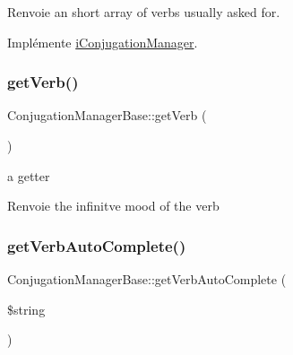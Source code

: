 \begin{DoxyReturn}{Renvoie}
an short array of verbs usually asked for. 
\end{DoxyReturn}


Implémente \hyperlink{interfacei_conjugation_manager_a2a7ed39313c1c92ef5c01c88895de36e}{i\+Conjugation\+Manager}.

\hypertarget{class_conjugation_manager_base_ae6e9d7d21418b8b9831b2b1f29eca4a6}{}\label{class_conjugation_manager_base_ae6e9d7d21418b8b9831b2b1f29eca4a6} 
\subsubsection{\texorpdfstring{get\+Verb()}{getVerb()}}
{\footnotesize\ttfamily Conjugation\+Manager\+Base\+::get\+Verb (\begin{DoxyParamCaption}{ }\end{DoxyParamCaption})}



a getter 

\begin{DoxyReturn}{Renvoie}
the infinitve mood of the verb 
\end{DoxyReturn}
\hypertarget{class_conjugation_manager_base_ac645c98d094ad5be6eec9950d04ee937}{}\label{class_conjugation_manager_base_ac645c98d094ad5be6eec9950d04ee937} 
\subsubsection{\texorpdfstring{get\+Verb\+Auto\+Complete()}{getVerbAutoComplete()}}
{\footnotesize\ttfamily Conjugation\+Manager\+Base\+::get\+Verb\+Auto\+Complete (\begin{DoxyParamCaption}\item[{}]{\$string }\end{DoxyParamCaption})}

\hypertarget{class_conjugation_manager_base_a840c42ab40fd243dc6fc60f977919c39}{}\label{class_conjugation_manager_base_a840c42ab40fd243dc6fc60f977919c39} 
